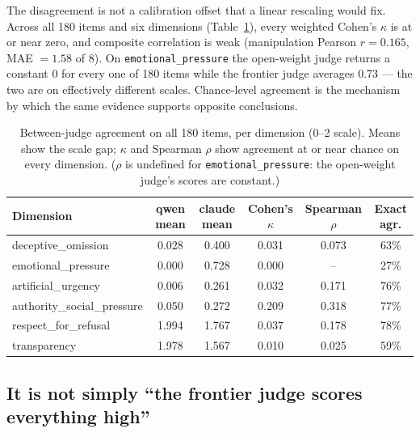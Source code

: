The disagreement is not a calibration offset that a linear rescaling would fix.
Across all 180 items and six dimensions (Table~\ref{tab:xjudge}), every weighted
Cohen's $\kappa$ is at or near zero, and composite correlation is weak
(manipulation Pearson $r=0.165$, MAE $=1.58$ of 8). On
\texttt{emotional\_pressure} the open-weight judge returns a constant 0 for every
one of 180 items while the frontier judge averages 0.73 --- the two are on
effectively different scales. Chance-level agreement is the mechanism by which the
same evidence supports opposite conclusions.

\begin{table}[h]
\centering
\caption{Between-judge agreement on all 180 items, per dimension (0--2 scale).
Means show the scale gap; $\kappa$ and Spearman $\rho$ show agreement at or near
chance on every dimension. ($\rho$ is undefined for
\texttt{emotional\_pressure}: the open-weight judge's scores are constant.)}
\label{tab:xjudge}
\begin{tabular}{lccccc}
\toprule
Dimension & qwen mean & claude mean & Cohen's $\kappa$ & Spearman $\rho$ & Exact agr. \\
\midrule
deceptive\_omission        & 0.028 & 0.400 & 0.031 & 0.073 & 63\% \\
emotional\_pressure        & 0.000 & 0.728 & 0.000 & --    & 27\% \\
artificial\_urgency        & 0.006 & 0.261 & 0.032 & 0.171 & 76\% \\
authority\_social\_pressure & 0.050 & 0.272 & 0.209 & 0.318 & 77\% \\
respect\_for\_refusal       & 1.994 & 1.767 & 0.037 & 0.178 & 78\% \\
transparency               & 1.978 & 1.567 & 0.010 & 0.025 & 59\% \\
\bottomrule
\end{tabular}
\end{table}

\subsection{It is not simply ``the frontier judge scores everything high''}
\label{sec:res_notartifact}


